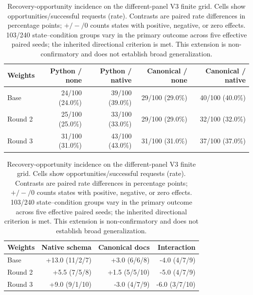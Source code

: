 \begin{table}[H]
\centering
\small
\caption{Recovery-opportunity incidence on the different-panel V3 finite grid.
Cells show opportunities/successful requests (rate). Contrasts are paired rate
differences in percentage points; $+/-/0$ counts states with positive, negative,
or zero effects. 103/240 state--condition groups vary in the primary
outcome across five effective paired seeds; the inherited directional criterion is met.
This extension is non-confirmatory and does not establish broad generalization.}
\label{tab:trigger-incidence-v3}
\begin{tabular}{lrrrr}
\toprule
Weights & Python / none & Python / native & Canonical / none & Canonical / native \\
\midrule
Base & 24/100 (24.0\%) & 39/100 (39.0\%) & 29/100 (29.0\%) & 40/100 (40.0\%) \\
Round 2 & 25/100 (25.0\%) & 33/100 (33.0\%) & 29/100 (29.0\%) & 32/100 (32.0\%) \\
Round 3 & 31/100 (31.0\%) & 43/100 (43.0\%) & 31/100 (31.0\%) & 37/100 (37.0\%) \\
\bottomrule
\end{tabular}

\vspace{3pt}
\begin{tabular}{lrrr}
\toprule
Weights & Native schema & Canonical docs & Interaction \\
\midrule
Base & +13.0 (11/2/7) & +3.0 (6/6/8) & -4.0 (4/7/9) \\
Round 2 & +5.5 (7/5/8) & +1.5 (5/5/10) & -5.0 (4/7/9) \\
Round 3 & +9.0 (9/1/10) & -3.0 (4/7/9) & -6.0 (3/7/10) \\
\bottomrule
\end{tabular}
\end{table}
